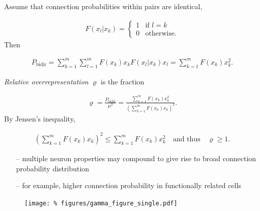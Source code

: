 \begin{frame}{}
  Assume that connection probabilities within pairs are identical,
  
\begin{align*}
  F(x_l | x_k) = \begin{cases} 1 & \text{if $l = k$} \\ 0 & \text{otherwise.} \end{cases}
\end{align*}
Then

\begin{align*}
  P_{\text{bidir}} = \sum_{k=1}^m \sum_{l=1}^m F(x_k) x_k F(x_l | x_k) x_l = \sum_{k=1}^m F(x_k) x_k^2 .
\end{align*}

\vspace{0.4cm}

\textit{Relative overrepresentation} $\varrho$ is the fraction

\begin{align*}
  \varrho = \frac{P_{\text{bidir}}}{\mu^2} = \frac{\sum_{k=1}^m F(x_k) x_k^2 }{\left(\sum_{k=1}^m F(x_k) x_k\right)^2}.
\end{align*}
By Jensen's inequality,

\begin{align*}
  \left(\sum_{k=1}^m F(x_k) x_k\right)^2 \leq \sum_{k=1}^m F(x_k) x_k^2  \quad \text{and thus} \quad \varrho \geq 1.
\end{align*}	

\end{frame}


\begin{frame}{}

  \begin{itemize}[leftmargin=1cm]
    \large
    \itemsep9pt
  \item[--] multiple neuron properties may compound to give rise to
    broad connection probability distribution
  \item[--] for example, higher connection probability in functionally
    related cells \parencite{Lee2016a}

       
  \end{itemize}

  \vspace{0.4cm}
  
  \begin{figure}
    \centering
    \texttt{[image: \%
      figures/gamma\_figure\_single.pdf]} %
  \end{figure}
  

  
\end{frame}




